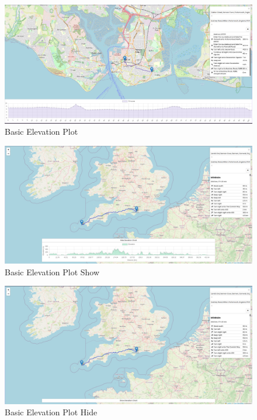 \begin{figure}[!ht]
    \centering
    \includegraphics[width=425px]{figures/Progress Images/Iteration-1/SR28/Basic Elevation Plot.png}
    \caption{Basic Elevation Plot}
\end{figure}

\begin{figure}[!ht]
    \centering
    \includegraphics[width=425px]{figures/Progress Images/Iteration-1/SR28/Basic Elevation Plot Show Functionality.png}
    \caption{Basic Elevation Plot Show}
\end{figure}

\begin{figure}[!ht]
    \centering
    \includegraphics[width=425px]{figures/Progress Images/Iteration-1/SR28/Basic Elevation Plot Hide Functionality.png}
    \caption{Basic Elevation Plot Hide}
\end{figure}
